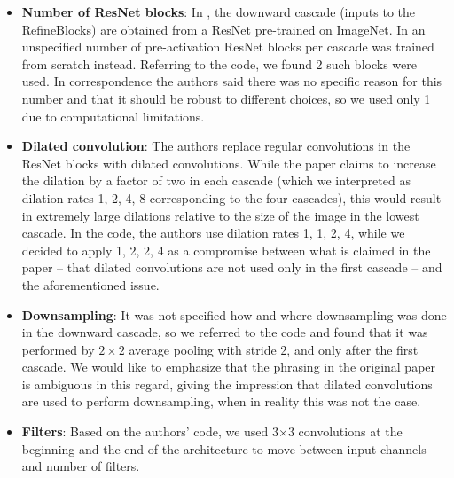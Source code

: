 \begin{itemize}
    \item \textbf{Number of ResNet blocks}: In \cite{refinenet}, the downward cascade (inputs to the RefineBlocks) are obtained from %
    a ResNet pre-trained on ImageNet. In \cite{ncsn-paper} an unspecified number of pre-activation ResNet blocks per cascade was trained from scratch instead. Referring to the code, we found 2 such blocks were used. In correspondence the authors said there was no specific reason for this number and that it should be robust to different choices, so we used only 1 due to computational limitations. 
    \item \textbf{Dilated convolution}: The authors replace regular convolutions in the ResNet blocks with dilated convolutions. While the paper claims to increase the dilation by a factor of two in each cascade (which we interpreted as dilation rates 1, 2, 4, 8 corresponding to the four cascades), this would result in extremely large dilations relative to the size of the image in the lowest cascade. In the code, the authors use dilation rates 1, 1, 2, 4, while we decided to apply 1, 2, 2, 4 as a compromise between what is claimed in the paper -- that dilated convolutions are not used only in the first cascade -- and the aforementioned issue. %
    \item \textbf{Downsampling}: It was not specified how and where downsampling was done in the downward cascade, so we referred to the code and found that it was performed by $2\times 2$ average pooling with stride 2, and only after the first cascade. We would like to emphasize that the phrasing in the original paper is ambiguous in this regard, giving the impression that dilated convolutions are used to perform downsampling, when in reality this was not the case.
    \item \textbf{Filters}: Based on the authors' code, we used 3$\times$3  convolutions at the beginning and the end of the architecture to move between input channels and number of filters. 
    

\end{itemize}

